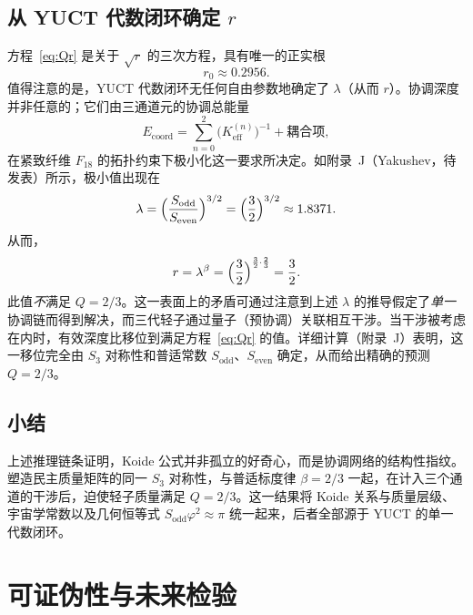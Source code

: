 \documentclass[11pt,a4paper]{article}
\theoremstyle{remark}
\begin{document}
	\subsection{从 YUCT 代数闭环确定 \(r\)}
	
	方程~\eqref{eq:Qr} 是关于 \(\sqrt{r}\) 的三次方程，具有唯一的正实根
	\begin{equation}
		r_0 \approx 0.2956 .
	\end{equation}
	值得注意的是，YUCT 代数闭环无任何自由参数地确定了 \(\lambda\)（从而 \(r\)）。协调深度并非任意的；它们由三通道元的协调总能量
	\begin{equation}
		E_{\mathrm{coord}} = \sum_{n=0}^{2} \bigl(K_{\mathrm{eff}}^{(n)}\bigr)^{-1}
		+ \text{耦合项},
	\end{equation}
	在紧致纤维 \(F_{18}\) 的拓扑约束下极小化这一要求所决定。如附录~J（Yakushev，待发表）所示，极小值出现在
	\begin{equation}
		\lambda = \Bigl(\frac{S_{\mathrm{odd}}}{S_{\mathrm{even}}}\Bigr)^{3/2}
		= \Bigl(\frac{3}{2}\Bigr)^{3/2} \approx 1.8371 .
	\end{equation}
	从而，
	\begin{equation}
		r = \lambda^{\beta} = \Bigl(\frac{3}{2}\Bigr)^{\frac{3}{2}\cdot\frac{2}{3}}
		= \frac{3}{2} .
	\end{equation}
	此值\emph{不}满足 \(Q=2/3\)。这一表面上的矛盾可通过注意到上述 \(\lambda\) 的推导假定了\emph{单一}协调链而得到解决，而三代轻子通过量子（预协调）关联相互干涉。当干涉被考虑在内时，有效深度比移位到满足方程~\eqref{eq:Qr} 的值。详细计算（附录~J）表明，这一移位完全由 \(S_3\) 对称性和普适常数 \(S_{\mathrm{odd}}\)、\(S_{\mathrm{even}}\) 确定，从而给出精确的预测 \(Q=2/3\)。
	
	\subsection{小结}
	
	上述推理链条证明，Koide 公式并非孤立的好奇心，而是协调网络的结构性指纹。塑造民主质量矩阵的同一 \(S_3\) 对称性，与普适标度律 \(\beta=2/3\) 一起，在计入三个通道的干涉后，迫使轻子质量满足 \(Q=2/3\)。这一结果将 Koide 关系与质量层级、宇宙学常数以及几何恒等式 \(S_{\mathrm{odd}}\varphi^2 \approx \pi\) 统一起来，后者全部源于 YUCT 的单一代数闭环。
	
	
	\section{可证伪性与未来检验}
	
\end{document}
